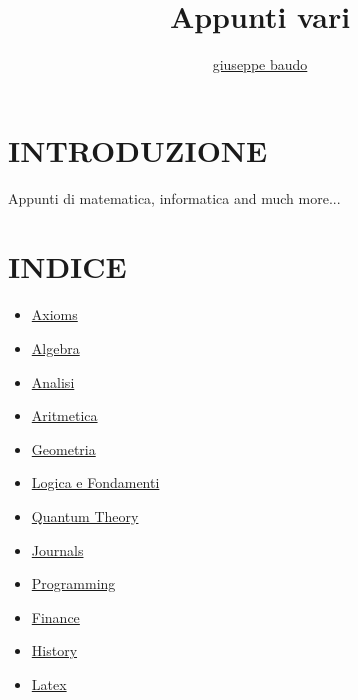 \documentclass[a4paper,10pt]{article}
\title{Appunti vari}
\author{\href{http://www.baudo.hol.es}{giuseppe baudo}}
\begin{document}
\maketitle

\section{INTRODUZIONE}
Appunti di matematica, informatica and much more...

\section{INDICE}
\begin{itemize}
  \item \href{./Axioms.html}{Axioms}
  \item \href{./AlgebraIndex.html}{Algebra}
  \item \href{./Analisi.html}{Analisi} 
  \item \href{./Aritmetica.html}{Aritmetica}
  \item \href{./Geometria.html}{Geometria} 
  \item \href{./Logics.html}{Logica e Fondamenti}
  \item \href{./QuantumTheory.html}{Quantum Theory}
  \item \href{./Journals.html}{Journals}
  \item \href{./Programming.html}{Programming}
  \item \href{./finance.html}{Finance} 
  \item \href{./history.html}{History} 
  \item \href{./latex.html}{Latex} 
  
\end{itemize}
\end{document}
